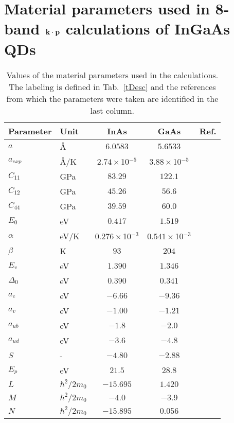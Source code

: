 \chapter{Material parameters used in 8-band $\bf{k \cdot p}$ calculations of InGaAs QDs} \label{app:material_params}

\begin{table*}[!ht]
	\begin{center}
		\begin{tabular}{llccc}
			\hline \hline
			Parameter & Unit & InAs & GaAs & Ref.\\
			\hline
			$a$ & \AA & $6.0583$ & $5.6533$  & \cite{Vurgaftman}\\
			$a_{exp}$ & \AA /K& $2.74\times$10$^{-5}$ & $3.88\times$10$^{-5}$  & \cite{Vurgaftman}\\
			$C_{11}$ & GPa& $83.29$ & $122.1$  & \cite{Vurgaftman}\\
			$C_{12}$ & GPa& $45.26$ & $56.6$  & \cite{Vurgaftman}\\
			$C_{44}$ & GPa& $39.59$ & $60.0$ & \cite{Vurgaftman}\\
			$E_0$ & eV & $0.417$ & $1.519$ &  \cite{Vurgaftman}\\
			$\alpha$ & eV/K & $0.276\times$10$^{-3}$ & $0.541\times$10$^{-3}$ &  \cite{Vurgaftman}\\
			$\beta$ & K & $93$ & $204$ & \cite{Vurgaftman}\\
			$E_v$ & eV & $1.390$ & $1.346$ &  \cite{zunger}\\
			$\Delta_0$ & eV & $0.390$ & $0.341$ &  \cite{Vurgaftman}\\
			$a_c$ & eV & $-6.66$ & $-9.36$ & \cite{zunger}\\
			$a_v$ & eV & $-1.00$ & $-1.21$ & \cite{zunger}\\
			$a_{ub}$ & eV & $-1.8$& $-2.0$&  \cite{Vurgaftman}\\
			$a_{ud}$ & eV & $-3.6$& $-4.8$&  \cite{Vurgaftman}\\
			$S$ & -& $-4.80$ & $-2.88$ & \cite{Vurgaftman}\\
			$E_p$ & eV & $21.5$ & $28.8$ & \cite{Vurgaftman}\\
			$L$ & $\hbar^2/2m_0$ & $-15.695$ & $1.420$ & \cite{Vurgaftman}\\
			$M$ & $\hbar^2/2m_0$ & $-4.0$ & $-3.9$ & \cite{Vurgaftman}\\
			$N$ & $\hbar^2/2m_0$ & $-15.895$ & $0.056$ & \cite{Vurgaftman}\\
			\hline \hline
		\end{tabular}
	\end{center}
	\caption{Values of the material parameters used in the calculations. The labeling is defined in Tab.~\ref{tDesc} and the references from which the parameters were taken are identified in the last column.\label{tSb2} 
	}
\end{table*}

